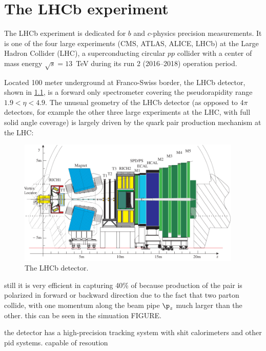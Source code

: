 \chapter{The LHCb experiment}
\label{ref:detector}

The LHCb experiment is dedicated for $b$ and $c$-physics precision measurements.
It is one of the four large experiments
(CMS, ATLAS, ALICE, LHCb) at the Large Hadron Collider (LHC),
a superconducting circular $pp$ collider with a center of mass energy
$\sqrt{s} = 13$~TeV during its run 2 (2016--2018) operation period.

Located 100 meter underground at Franco-Swiss border,
the LHCb detector,
shown in \cref{fig:lhcb-detector},
is a forward only spectrometer covering the pseudorapidity range
$1.9 < \eta < 4.9$.
The unusual geometry of the LHCb detector
(as opposed to $4\pi$ detectors,
for example the other three large experiments at the LHC,
with full solid angle coverage)
is largely driven by the \bbbar quark pair production mechanism at the LHC:

\begin{figure}[!htb]
    \centering
    \includegraphics[width=0.95\textwidth]{./figs-detector/lhcb_detector_view.pdf}
    \caption{The LHCb detector.}
    \label{fig:lhcb-detector}
\end{figure}

still it is very efficient in capturing 40\% of \bbbar because production
of the pair is polarized in forward or backward direction due to the fact
that two parton collide, with one momentum along the beam pipe $\p_z$ much larger
than the other.
this can be seen in the simuation FIGURE.

the detector has a high-precision tracking system with shit calorimeters and
other pid systems.
capable of resoution
